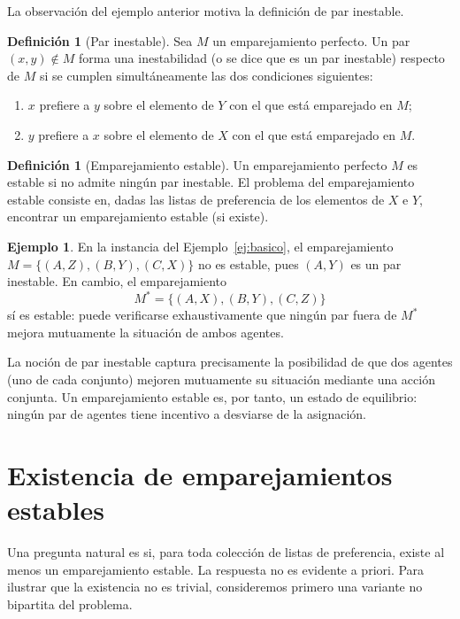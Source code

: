 \documentclass[12pt, spanish, oneside, openany]{book}
\theoremstyle{uprightplain}
\theoremstyle{definition}
\newtheorem{definicion}[teorema]{Definición}
\newtheorem{ejemplo}[teorema]{Ejemplo}
\theoremstyle{remark}
\theoremstyle{definition}
\begin{document}
La observación del ejemplo anterior motiva la definición de par inestable.

\begin{definicion}[Par inestable]
\label{def:par-inestable}
Sea $M$ un emparejamiento perfecto. Un par $(x,y) \notin M$ forma una inestabilidad (o se dice que es un par inestable) respecto de $M$ si se cumplen simultáneamente las dos condiciones siguientes:
\begin{enumerate}
    \item $x$ prefiere a $y$ sobre el elemento de $Y$ con el que está emparejado en $M$;
    \item $y$ prefiere a $x$ sobre el elemento de $X$ con el que está emparejado en $M$.
\end{enumerate}
\end{definicion}

\begin{definicion}[Emparejamiento estable]
\label{def:estable}
Un emparejamiento perfecto $M$ es estable si no admite ningún par inestable. El problema del emparejamiento estable consiste en, dadas las listas de preferencia de los elementos de $X$ e $Y$, encontrar un emparejamiento estable (si existe).
\end{definicion}

\begin{ejemplo}
En la instancia del Ejemplo~\ref{ej:basico}, el emparejamiento $M=\{(A,Z),(B,Y),(C,X)\}$ no es estable, pues $(A,Y)$ es un par inestable. En cambio, el emparejamiento
\[
M^*=\{(A,X),(B,Y),(C,Z)\}
\]
sí es estable: puede verificarse exhaustivamente que ningún par fuera de $M^*$ mejora mutuamente la situación de ambos agentes.
\end{ejemplo}

La noción de par inestable captura precisamente la posibilidad de que dos agentes (uno de cada conjunto) mejoren mutuamente su situación mediante una acción conjunta. Un emparejamiento estable es, por tanto, un estado de equilibrio: ningún par de agentes tiene incentivo a desviarse de la asignación.

\section{Existencia de emparejamientos estables}

Una pregunta natural es si, para toda colección de listas de preferencia, existe al menos un emparejamiento estable. La respuesta no es evidente a priori. Para ilustrar que la existencia no es trivial, consideremos primero una variante no bipartita del problema.
\end{document}
